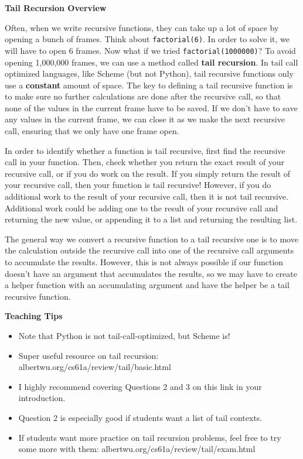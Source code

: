 \textbf{Tail Recursion Overview }

Often, when we write recursive functions, they can take up a lot of space by opening a bunch of frames. Think about \texttt{factorial(6)}. In order to solve it, we will have to open 6 frames. Now what if we tried \texttt{factorial(1000000)}? To avoid opening 1,000,000 frames, we can use a method called \textbf{tail recursion}. In tail call optimized languages, like Scheme (but not Python), tail recursive functions only use a \textbf{constant} amount of space. The key to defining a tail recursive function is to make sure no further calculations are done after the recursive call, so that none of the values in the current frame have to be saved. If we don’t have to save any values in the current frame, we can close it as we make the next recursive call, ensuring that we only have one frame open. 

In order to identify whether a function is tail recursive, first find the recursive call in your function. Then, check whether you return the exact result of your recursive call, or if you do work on the result. If you simply return the result of your recursive call, then your function is tail recursive! However, if you do additional work to the result of your recursive call, then it is not tail recursive. Additional work could be adding one to the result of your recursive call and returning the new value, or appending it to a list and returning the resulting list.

The general way we convert a recursive function to a tail recursive one is to move the calculation outside the recursive call into one of the recursive call arguments to accumulate the results. However, this is not always possible if our function doesn’t have an argument that accumulates the results, so we may have to create a helper function with an accumulating argument and have the helper be a tail recursive function.

\begin{guide}
\begin{blocksection}
\textbf{Teaching Tips}
  \begin{itemize}
    \item Note that Python is not tail-call-optimized, but Scheme is!
    \item Super useful resource on tail recursion: albertwu.org/cs61a/review/tail/basic.html
    \item I highly recommend covering Questions 2 and 3 on this link in your introduction.
    \item Question 2 is especially good if students want a list of tail contexts.
    \item If students want more practice on tail recursion problems, feel free to try some more with them: albertwu.org/cs61a/review/tail/exam.html
  \end{itemize}
\end{blocksection}
\end{guide}
